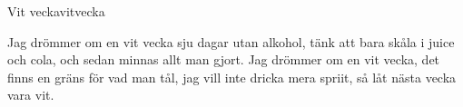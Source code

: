 \begin{song}{Vit vecka}{vitvecka}
\begin{vers}
Jag drömmer om en vit vecka
sju dagar utan alkohol,
tänk att bara skåla
i juice och cola,
och sedan minnas allt man gjort.
Jag drömmer om en vit vecka,
det finns en gräns för vad man tål,
jag vill inte dricka mera spriit,
så låt nästa vecka vara vit.
\end{vers}
\end{song}
